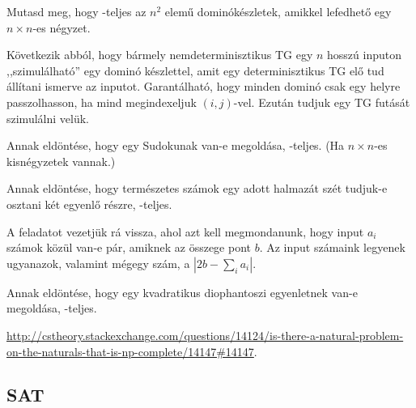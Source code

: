 \begin{Exercise}[counter={sorszam}, difficulty=1]
	Mutasd meg, hogy \NP-teljes az $n^2$ elem\H u domin\'ok\'eszletek, amikkel lefedhet\H o egy $n\times n$-es n\'egyzet.
\end{Exercise}	
\begin{Answer}
	K\"ovetkezik abb\'ol, hogy b\'armely nemdeterminisztikus TG egy $n$ hossz\'u inputon ,,szimul\'alhat\'o'' egy domin\'o k\'eszlettel, amit egy determinisztikus TG el\H o tud \'all\'itani ismerve az inputot.
	Garant\'alhat\'o, hogy minden domin\'o csak egy helyre passzolhasson, ha mind megindexeljuk $(i,j)$-vel.
	Ezut\'an tudjuk egy TG fut\'as\'at szimul\'alni vel\"uk.
\end{Answer}

\begin{Exercise}[counter={sorszam}, difficulty=1]
	Annak eldöntése, hogy egy Sudokunak van-e megold\'asa, \NP-teljes. (Ha $n\times n$-es kisn\'egyzetek vannak.)
\end{Exercise}	




\begin{Exercise}[counter={sorszam}, difficulty=0]
	Annak eldöntése, hogy term\'eszetes sz\'amok egy adott halmaz\'at sz\'et tudjuk-e osztani k\'et egyenl\H o r\'eszre, \NP-teljes.
\end{Exercise}	
\begin{Answer}
	A  feladatot vezetj\"uk r\'a vissza, ahol azt kell megmondanunk, hogy input $a_i$ sz\'amok k\"oz\"ul van-e p\'ar, amiknek az \"osszege pont $b$. Az input sz\'amaink legyenek ugyanazok, valamint m\'egegy sz\'am, a $|2b-\sum_i a_i|.$
\end{Answer}

\begin{Exercise}[counter={sorszam}, difficulty=2]
	Annak eldöntése, hogy egy kvadratikus diophantoszi egyenletnek van-e
	megold\'asa, \NP-teljes.
\end{Exercise}	
\begin{Answer}
	\url{http://cstheory.stackexchange.com/questions/14124/is-there-a-natural-problem-on-the-naturals-that-is-np-complete/14147#14147}.
\end{Answer}

\subsection{SAT}


